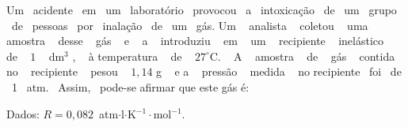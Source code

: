 Um  acidente	  em	  um	  laboratório	  provocou	
  a	
  intoxicação	
  de	
  um	
  grupo	
  de	
  pessoas	
  por	
  inalação	
  de	
  um	
  gás.	
Um	
   analista	
   coletou	
   uma	
   amostra	
   desse	
   gás	
   e	
   a	
   introduziu	
   em	
   um	
   recipiente	
   inelástico	
   de	
   $1$	
   dm$^3$ ,	
   à	
temperatura	
   de	
   $27 ^\circ$C.	
   A	
   amostra	
   de	
   gás	
   contida	
   no	
   recipiente	
   pesou	
   $1,14$ g
   e a	
   pressão	
   medida	
   no	
recipiente	
  foi	
  de	
  1	
  atm.	
  Assim,	
  pode-se	afirmar que este gás é:	


 Dados: $R  =  0,082$ atm$\cdot$l$\cdot$K$^{-1}\cdot$mol$^{-1}$.
 
 
 \begin{enumerate*}[label = (\alph*), itemjoin={\qquad}]
	\item {}
	\item {}
	\item {}
	\item {}
	\item {}
\end{enumerate*}
